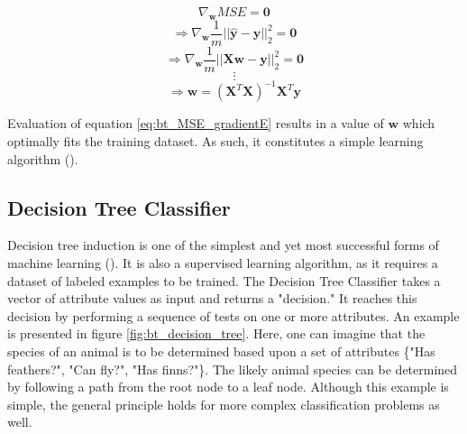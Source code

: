 \begin{equation}
    \label{eq:bt_MSE_gradientB}
    \nabla_{\mathbf{w}}MSE=\mathbf{0}
\end{equation}
\begin{equation}
    \Rightarrow \nabla_{\mathbf{w}}\frac{1}{m}||\hat{\mathbf{y}}-\mathbf{y}||^2_2=\mathbf{0}
\end{equation}
\begin{equation}
    \Rightarrow \nabla_{\mathbf{w}}\frac{1}{m}||\mathbf{X}\mathbf{w}-\mathbf{y}||^2_2=\mathbf{0}
\end{equation}
\begin{equation*}
    \vdots
\end{equation*}
\begin{equation}
    \label{eq:bt_MSE_gradientE}
    \Rightarrow \mathbf{w}=(\mathbf{X}^T\mathbf{X})^{-1}\mathbf{X}^T\mathbf{y}
\end{equation}

Evaluation of equation \ref{eq:bt_MSE_gradientE} results in a value of $\mathbf{w}$ which optimally fits the training dataset. As such, it constitutes a simple learning algorithm (\cite{goodfellow2016}).


\subsection{Decision Tree Classifier}

Decision tree induction is one of the simplest and yet most successful forms of machine learning (\cite{russell2009}). It is also a supervised learning algorithm, as it requires a dataset of labeled examples to be trained. The Decision Tree Classifier takes a vector of attribute values as input and returns a "decision." It reaches this decision by performing a sequence of tests on one or more attributes. An example is presented in figure \ref{fig:bt_decision_tree}. Here, one can imagine that the species of an animal is to be determined based upon a set of attributes \{"Has feathers?", "Can fly?", "Has finns?"\}. The likely animal species can be determined by following a path from the root node to a leaf node. Although this example is simple, the general principle holds for more complex classification problems as well.

